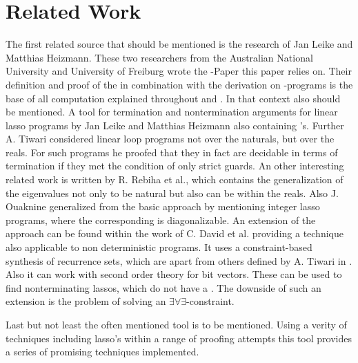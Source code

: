 \chapter{Related Work}
\label{chapter:related-work}

The first related source that should be mentioned is the research of Jan Leike and Matthias Heizmann. These two researchers from the Australian National University and University of Freiburg wrote the \gna-Paper this paper relies on. Their definition and proof of the \gna in combination with the derivation on \lasso-programs is the base of all computation explained throughout  and . \cite{leike2014geometric} \newline
In that context also  should be mentioned. A tool for termination and nontermination arguments for linear lasso programs by Jan Leike and Matthias Heizmann also containing \gna's. \cite{LassoRanker}\newline
Further A. Tiwari considered linear loop programs not over the naturals, but over the reals. For such programs he proofed that they in fact are decidable in terms of termination if they met the condition of only strict guards. \cite{tiwari2004termination} \newline
An other interesting related work is written by R. Rebiha et al., which contains the generalization of the eigenvalues not only to be natural but also can be within the reals. \cite{rebiha2014characterization} Also J. Ouaknine generalized from the basic approach by mentioning integer lasso programs, where the corresponding \updatematrix is diagonalizable. \cite{ouaknine2014termination} \newline
An extension of the \gna approach can be found within the work of C. David et al. providing a technique also applicable to non deterministic programs. It uses a constraint-based synthesis of recurrence sets, which are apart from others defined by A. Tiwari in \cite{tiwari2004termination}. Also it can work with second order theory for bit vectors. These can be used to find nonterminating lassos, which do not have a \gna. The downside of such an extension is the problem of solving an $\exists\forall\exists$-constraint. \cite{david2015unrestricted} \cite{leike2014geometric}

Last but not least the often mentioned tool \aprove is to be mentioned. Using a verity of techniques including lasso's within a range of proofing attempts this tool provides a series of promising techniques implemented. 

